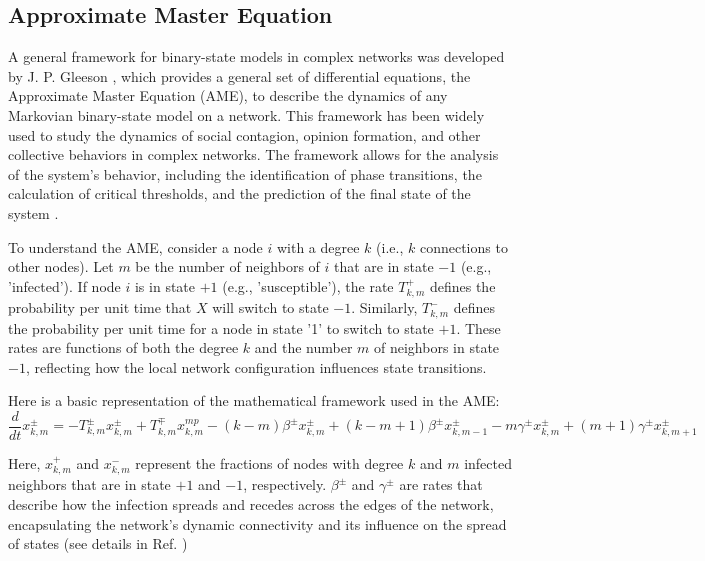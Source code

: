 \subsection{\label{sec:Approximate Master Equation} Approximate Master Equation}

A general framework for binary-state models in complex networks was developed by J. P. Gleeson \cite{gleeson-2011,gleeson-2013}, which provides a general set of differential equations, the Approximate Master Equation (AME), to describe the dynamics of any Markovian binary-state model on a network. This framework has been widely used to study the dynamics of social contagion, opinion formation, and other collective behaviors in complex networks. The framework allows for the analysis of the system's behavior, including the identification of phase transitions, the calculation of critical thresholds, and the prediction of the final state of the system \cite{gleeson-2013}.

To understand the AME, consider a node $i$ with a degree $k$ (i.e., $k$ connections to other nodes). Let $ m$ be the number of neighbors of $i$ that are in state $-1$ (e.g., 'infected'). If node $i$ is in state $+1$ (e.g., 'susceptible'), the rate \( T^{+}_{k,m} \) defines the probability per unit time that \( X \) will switch to state $-1$. Similarly, \( T^{-}_{k,m} \) defines the probability per unit time for a node in state '1' to switch to state $+1$. These rates are functions of both the degree \( k \) and the number \( m \) of neighbors in state $-1$, reflecting how the local network configuration influences state transitions.

Here is a basic representation of the mathematical framework used in the AME:
\begin{equation}
    \frac{d}{dt} x^{\pm}_{k,m} = -T^{\pm}_{k,m} x^{\pm}_{k,m} + T^{\mp}_{k,m} x^{mp}_{k,m} - (k-m) \beta^{\pm} x^{\pm}_{k,m} + (k-m+1) \beta^{\pm} x^{\pm}_{k,m-1} - m \gamma^{\pm} x^{\pm}_{k,m} + (m+1) \gamma^{\pm} x^{\pm}_{k,m+1}
\end{equation}

Here, $x^{+}_{k,m}$ and $x^{-}_{k,m}$ represent the fractions of nodes with degree \( k \) and \( m \) infected neighbors that are in state $+1$ and $-1$, respectively. $\beta^{\pm}$ and $\gamma^{\pm}$ are rates that describe how the infection spreads and recedes across the edges of the network, encapsulating the network's dynamic connectivity and its influence on the spread of states (see details in Ref. \cite{gleeson-2013})

